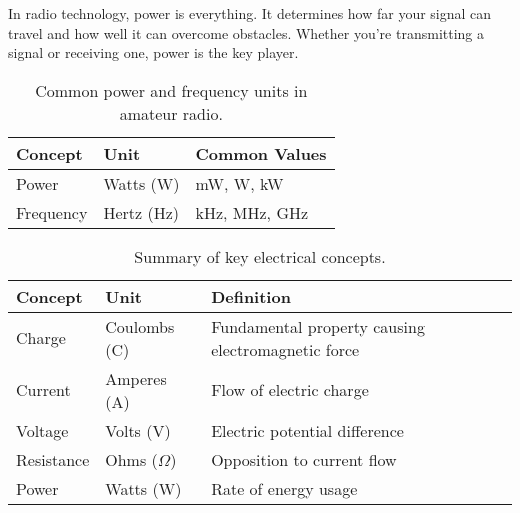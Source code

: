 In radio technology, power is everything. It determines how far your signal can travel and how well it can overcome obstacles. Whether you're transmitting a signal or receiving one, power is the key player.

\begin{table}[h]
    \centering
    \caption{Common power and frequency units in amateur radio.}
    \label{tab:power-freq-units}
    \begin{tabular}{|l|l|l|}
        \hline
        \textbf{Concept} & \textbf{Unit} & \textbf{Common Values} \\
        \hline
        Power & Watts (W) & mW, W, kW \\
        Frequency & Hertz (Hz) & kHz, MHz, GHz \\
        \hline
    \end{tabular}
\end{table}

\begin{table}[h]
    \centering
    \caption{Summary of key electrical concepts.}
    \label{tab:electrical-concepts}
    \begin{tabular}{|l|l|l|}
        \hline
        \textbf{Concept} & \textbf{Unit} & \textbf{Definition} \\
        \hline
        Charge & Coulombs (C) & Fundamental property causing electromagnetic force \\
        Current & Amperes (A) & Flow of electric charge \\
        Voltage & Volts (V) & Electric potential difference \\
        Resistance & Ohms (\(\Omega\)) & Opposition to current flow \\
        Power & Watts (W) & Rate of energy usage \\
        \hline
    \end{tabular}
\end{table}



